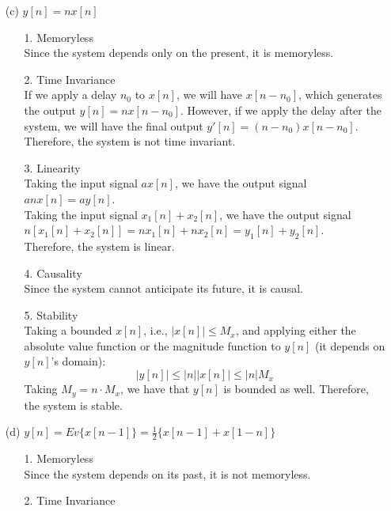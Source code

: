 \documentclass{article}
\begin{document}
\begin{enumerate}
    \item[(c)] $y[n] = nx[n]$
        \begin{enumerate}
            \item[1.] Memoryless \\
            Since the system depends only on the present, it is memoryless.
            \item[2.] Time Invariance \\
                If we apply a delay $n_{0}$ to $x[n]$, we will have $x[n-n_{0}]$, which generates the output $y[n] = nx[n-n_{0}]$. However, if we apply the delay after the system, we will have the final output $y'[n] = (n-n_{0})x[n-n_{0}]$. Therefore, the system is not time invariant.
            \item[3.] Linearity \\ 
                Taking the input signal $ax[n]$, we have the output signal $anx[n] = ay[n]$. \\
                Taking the input signal $x_{1}[n]+x_{2}[n]$, we have the output signal $n[x_{1}[n]+x_{2}[n]] = nx_{1}[n] + nx_{2}[n] = y_{1}[n]+y_{2}[n]$. \\
                Therefore, the system is linear.
            \item[4.] Causality \\
                Since the system cannot anticipate its future, it is causal.
            \item[5.] Stability \\
                Taking a bounded $x[n]$, i.e., $|x[n]| \leq M_{x}$, and applying either the absolute value function or the magnitude function to $y[n]$ (it depends on $y[n]$'s domain):
                \begin{equation*}
                |y[n]| \leq |n||x[n]| \leq |n|M_{x}
                \end{equation*}
                Taking $M_{y}=n\cdot M_{x}$, we have that $y[n]$ is bounded as well. Therefore, the system is stable.
        \end{enumerate}
    \item[(d)] $y[n] = Ev\{x[n-1]\} = \frac{1}{2}\{x[n-1]+x[1-n]\}$
        \begin{enumerate}
            \item[1.] Memoryless \\
            Since the system depends on its past, it is not memoryless.
            \item[2.] Time Invariance \\

\end{enumerate}
\end{enumerate}
\end{document}
